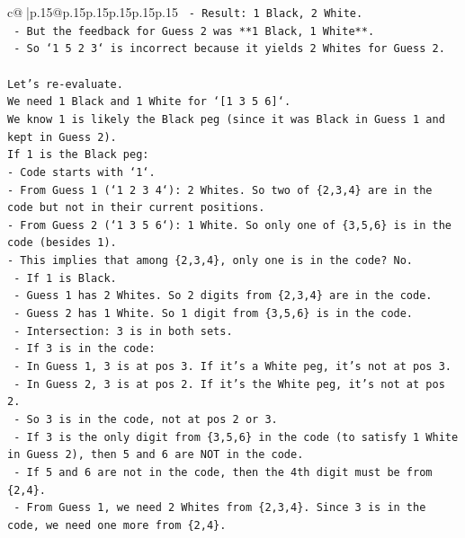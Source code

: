\documentclass{article}
\begin{document}
{\begin{supertabular}{c@{$\;$}|p{.15\linewidth}@{}p{.15\linewidth}p{.15\linewidth}p{.15\linewidth}p{.15\linewidth}p{.15\linewidth}}
{{{\texttt{            {-}   Result: 1 Black, 2 White.} \\
\texttt{    {-}   But the feedback for Guess 2 was **1 Black, 1 White**.} \\
\texttt{    {-}   So `1 5 2 3` is incorrect because it yields 2 Whites for Guess 2.} \\
\\ 
\texttt{Let's re{-}evaluate.} \\
\texttt{We need 1 Black and 1 White for `{[}1 3 5 6{]}`.} \\
\texttt{We know 1 is likely the Black peg (since it was Black in Guess 1 and kept in Guess 2).} \\
\texttt{If 1 is the Black peg:} \\
\texttt{{-}   Code starts with `1`.} \\
\texttt{{-}   From Guess 1 (`1 2 3 4`): 2 Whites. So two of \{2,3,4\} are in the code but not in their current positions.} \\
\texttt{{-}   From Guess 2 (`1 3 5 6`): 1 White. So only one of \{3,5,6\} is in the code (besides 1).} \\
\texttt{{-}   This implies that among \{2,3,4\}, only one is in the code? No.} \\
\texttt{    {-}   If 1 is Black.} \\
\texttt{    {-}   Guess 1 has 2 Whites. So 2 digits from \{2,3,4\} are in the code.} \\
\texttt{    {-}   Guess 2 has 1 White. So 1 digit from \{3,5,6\} is in the code.} \\
\texttt{    {-}   Intersection: 3 is in both sets.} \\
\texttt{    {-}   If 3 is in the code:} \\
\texttt{        {-}   In Guess 1, 3 is at pos 3. If it's a White peg, it's not at pos 3.} \\
\texttt{        {-}   In Guess 2, 3 is at pos 2. If it's the White peg, it's not at pos 2.} \\
\texttt{        {-}   So 3 is in the code, not at pos 2 or 3.} \\
\texttt{    {-}   If 3 is the only digit from \{3,5,6\} in the code (to satisfy 1 White in Guess 2), then 5 and 6 are NOT in the code.} \\
\texttt{    {-}   If 5 and 6 are not in the code, then the 4th digit must be from \{2,4\}.} \\
\texttt{    {-}   From Guess 1, we need 2 Whites from \{2,3,4\}. Since 3 is in the code, we need one more from \{2,4\}.} \\
}}}
\end{supertabular}}
\end{document}

